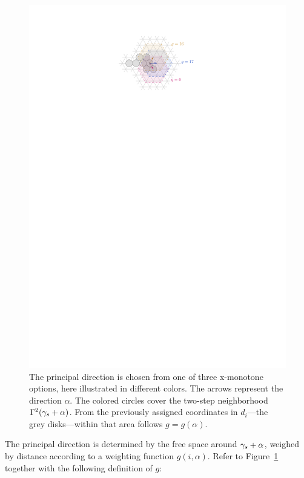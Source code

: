 \begin{figure}
    \centering
    \includegraphics{graphics/ch5_principaldirection.pdf}
    \caption[Principal direction]{The principal direction is chosen from one of three x-monotone options, here illustrated in different colors. The arrows represent the direction $\alpha$. The colored circles cover the two-step neighborhood $\Gamma^2(\gamma_s + \alpha)$. From the previously assigned coordinates in $d_i$---the grey disks---within that area follows $g = g(\alpha)$.}
    \label{fig:ch5-principaldirection}
\end{figure}

The principal direction is determined by the free space around $\gamma_s + \alpha$, weighed by distance according to a weighting function $g(i, \alpha)$. Refer to Figure~\ref{fig:ch5-principaldirection} together with the following definition of $g$:

